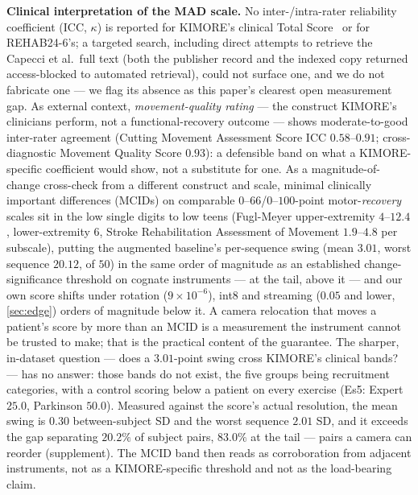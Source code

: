 \documentclass[10pt,twocolumn,letterpaper]{article}
\begin{document}
\textbf{Clinical interpretation of the MAD scale.} No inter-/intra-rater reliability coefficient (ICC,
$\kappa$) is reported for KIMORE's clinical Total Score~\cite{capecci2019kimore} or for REHAB24-6's; a
targeted search, including direct attempts to retrieve the Capecci et al.\ full text (both the publisher
record and the indexed copy returned access-blocked to automated retrieval), could not surface one, and
we do not fabricate one --- we flag its absence as this paper's clearest open measurement gap. As
external context, \emph{movement-quality rating} --- the construct KIMORE's clinicians perform, not a
functional-recovery outcome --- shows moderate-to-good inter-rater agreement (Cutting Movement
Assessment Score ICC $0.58$--$0.91$; cross-diagnostic Movement Quality Score $0.93$): a defensible band
on what a KIMORE-specific coefficient would show, not a substitute for one. As a magnitude-of-change
cross-check from a different construct and scale, minimal clinically important differences (MCIDs) on
comparable $0$--$66$/$0$--$100$-point motor-\emph{recovery} scales sit in the low single digits to low
teens (Fugl-Meyer upper-extremity $4$--$12.4$, lower-extremity $6$, Stroke Rehabilitation Assessment of
Movement $1.9$--$4.8$ per subscale), putting the augmented baseline's per-sequence swing (mean $3.01$,
worst sequence $20.12$, of $50$) in the same order of magnitude as an established change-significance
threshold on cognate instruments --- at the tail, above it --- and our own score shifts under rotation
($9\times10^{-6}$), int8 and streaming ($0.05$ and lower, \cref{sec:edge}) orders of magnitude below it.
A camera relocation that moves a patient's score by more than an MCID is a measurement the instrument
cannot be trusted to make; that is the practical content of the guarantee.
The sharper, in-dataset question --- does a $3.01$-point swing cross KIMORE's clinical
bands? --- has no answer: those bands do not exist, the five groups being recruitment categories, with
a control scoring below a patient on every exercise (Es5: Expert $25.0$, Parkinson $50.0$). Measured
against the score's actual resolution, the mean swing is $0.30$ between-subject SD and the worst
sequence $2.01$ SD, and it exceeds the gap separating $20.2\%$ of subject pairs, $83.0\%$ at the tail
--- pairs a camera can reorder (supplement). The MCID band then reads as corroboration from adjacent
instruments, not as a KIMORE-specific threshold and not as the load-bearing claim.
\end{document}
